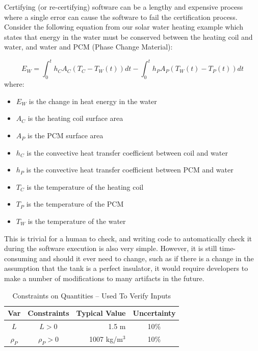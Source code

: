 \documentclass[sigconf]{acmart}
\newcommand{\authornt}[3]{\textcolor{#1}{[#3 ---#2]}}
\newcommand{\authornt}[3]{}
\newcommand{\wss}[1]{\authornt{blue}{SS}{#1}} %
\begin{document}
{Certifying (or re-certifying) software can be a lengthy and expensive process
where a single error can cause the software to fail the certification process.
Consider the following equation from our solar water heating example which
states that energy in the water must be conserved between the heating coil and
water, and water and PCM (Phase Change Material):

\begin{equation*}
E_W = \int_{0}^{t} h_C A_C (T_C - T_W(t)) dt - \int_{0}^{t} h_P A_P (T_W(t) - T_P(t)) dt
\end{equation*}
\noindent where:
\begin{itemize}
    \item $E_W$ is the change in heat energy in the water
    \item $A_C$ is the heating coil surface area
    \item $A_P$ is the PCM surface area
    \item $h_C$ is the convective heat transfer coefficient between coil and 
    water
    \item $h_P$ is the convective heat transfer coefficient between PCM and 
    water 
    \item $T_C$ is the temperature of the heating coil
    \item $T_P$ is the temperature of the PCM
    \item $T_W$ is the temperature of the water
\end{itemize}

This is trivial for a human to check, and writing code to automatically check it
during the software execution is also very simple. However, it is still
time-consuming and should it ever need to change, such as if there is a change
in the assumption that the tank is a perfect insulator, it would require
developers to make a number of modifications to many artifacts in the future.

\begin{table} 
\centering
\caption{Constraints on Quantities -- Used To Verify Inputs}
\begin{tabular}{c c r c } 
\toprule
\textbf{Var} & \textbf{Constraints} & \textbf{Typical Value} & \textbf{Uncertainty}\\ \midrule
$L$ & $L > 0$ & 1.5 m & 10\% \\ 
$\rho_P$ & $\rho_P > 0$    & 1007 kg/m$^3$    & 10\% \\
\bottomrule
\end{tabular}
\label{tab:pcm}
\end{table}

}
\end{document}
